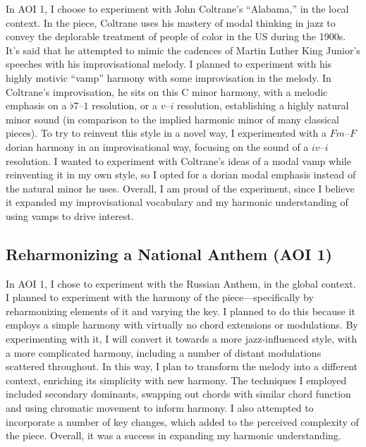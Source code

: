 \documentclass[12pt]{article}
\begin{document}
In AOI 1, I choose to experiment with John Coltrane’s “Alabama,” in the local context. In the piece, Coltrane uses his mastery of modal thinking in jazz to convey the deplorable treatment of people of color in the US during the 1900s. It’s said that he attempted to mimic the cadences of Martin Luther King Junior’s speeches with his improvisational melody.\autocite{alabama} I planned to experiment with his highly motivic “vamp” harmony with some improvisation in the melody. In Coltrane’s improvisation, he sits on this C minor harmony, with a melodic emphasis on a $\flat 7–1$ resolution, or a $v–i$ resolution, establishing a highly natural minor sound (in comparison to the implied harmonic minor of many classical pieces). To try to reinvent this style in a novel way, I experimented with a $Fm–F$ dorian harmony in an improvisational way, focusing on the sound of a $iv–i$ resolution. I wanted to experiment with Coltrane’s ideas of a modal vamp while reinventing it in my own style, so I opted for a dorian modal emphasis instead of the natural minor he uses. Overall, I am proud of the experiment, since I believe it expanded my improvisational vocabulary and my harmonic understanding of using vamps to drive interest.

\subsection{Reharmonizing a National Anthem (AOI 1)}

In AOI 1, I chose to experiment with the Russian Anthem, in the global context. I planned to experiment with the harmony of the piece—specifically by reharmonizing elements of it and varying the key. I planned to do this because it employs a simple harmony with virtually no chord extensions or modulations. By experimenting with it, I will convert it towards a more jazz-influenced style, with a more complicated harmony, including a number of distant modulations scattered throughout. In this way, I plan to transform the melody into a different context, enriching its simplicity with new harmony. The techniques I employed included secondary dominants, swapping out chords with similar chord function and using chromatic movement to inform harmony. I also attempted to incorporate a number of key changes, which added to the perceived complexity of the piece. Overall, it was a success in expanding my harmonic understanding.
\end{document}
